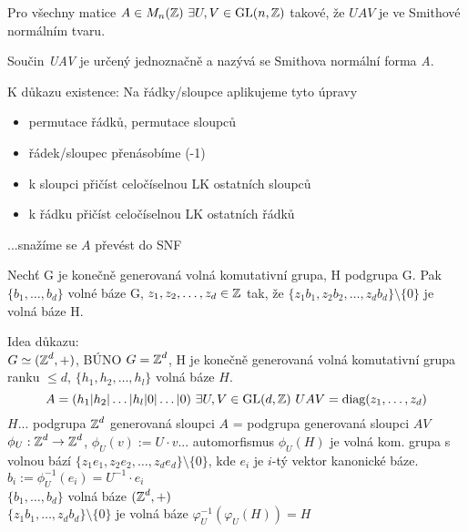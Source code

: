 \begin{theorem}
Pro všechny matice $A\in M_n(\operatorname{\mathbb{Z}})\ \exists U,V\in \operatorname{GL}(n,\operatorname{\mathbb{Z}})$ takové, že $UAV$ je ve Smithové normálním tvaru.
\end{theorem}
\begin{definition}
Součin \emph{UAV} je určený jednoznačně a nazývá se Smithova normální forma \emph{A}.
\end{definition}

K důkazu existence: Na řádky/sloupce aplikujeme tyto úpravy
\begin{itemize}
    \item permutace řádků, permutace sloupců
    \item řádek/sloupec přenásobíme (-1)
    \item k sloupci přičíst celočíselnou LK ostatních sloupců
    \item k řádku přičíst celočíselnou LK ostatních řádků
\end{itemize}
...snažíme se $A$ převést do SNF
\begin{theorem}
Nechť G je konečně generovaná volná komutativní grupa, H podgrupa G. Pak $\{b_1,\ldots,b_d\}$ volné báze G, $z_1,z_2,\ldots,z_d\in \operatorname{\mathbb{Z}}$ tak, že $\{z_1b_1,z_2b_2,\ldots,z_d b_d\}\setminus\{0\}$ je volná báze H.
\end{theorem}

Idea důkazu:\\
$G\simeq(\operatorname{\mathbb{Z}}^d,+)$, BÚNO $G=\operatorname{\mathbb{Z}}^d$, H je konečně generovaná volná komutativní grupa ranku $\leq d$, $\{h_1,h_2,\ldots,h_l\}$ volná báze $H$.
$$A=(h_1|h_2|\ldots|h_l|0|\ldots|0)\ \exists U,V \in \operatorname{GL}(d,\operatorname{\mathbb{Z}})\ UAV=\text{diag}(z_1,\ldots,z_d)$$
$H$... podgrupa $\operatorname{\mathbb{Z}}^d$ generovaná sloupci $A$ = podgrupa generovaná sloupci $AV$\\
$\phi_U:\operatorname{\mathbb{Z}}^d\rightarrow\operatorname{\mathbb{Z}}^d$, $\phi_U(v):=U\cdot v$... automorfismus
$\phi_U (H)$ je volná kom. grupa s volnou bází $\{z_1e_1,z_2e_2,\ldots,z_de_d\}\setminus\{0\}$, kde $e_i$ je $i$-tý vektor kanonické báze.\\
$b_i:=\phi_U^{-1}(e_i)=U^{-1}\cdot e_i$\\
$\{b_1,\ldots,b_d\}$ volná báze $(\operatorname{\mathbb{Z}}^d,+)$\\
$\{z_1b_1, \ldots,z_d b_d\}\setminus\{0\}$ je volná báze $\varphi_U^{-1}(\varphi_U(H))=H$
